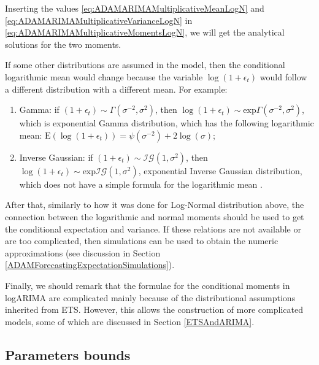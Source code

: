 \documentclass[]{book}
\providecommand{\tightlist}{%
  \setlength{\itemsep}{0pt}\setlength{\parskip}{0pt}}
\theoremstyle{definition}
\theoremstyle{definition}
\theoremstyle{definition}
\theoremstyle{definition}
\theoremstyle{remark}
\begin{document}
Inserting the values \eqref{eq:ADAMARIMAMultiplicativeMeanLogN} and \eqref{eq:ADAMARIMAMultiplicativeVarianceLogN} in \eqref{eq:ADAMARIMAMultiplicativeMomentsLogN}, we will get the analytical solutions for the two moments.

If some other distributions are assumed in the model, then the conditional logarithmic mean would change because the variable \(\log(1+\epsilon_t)\) would follow a different distribution with a different mean. For example:

\begin{enumerate}
\def\labelenumi{\arabic{enumi}.}
\tightlist
\item
  Gamma: if \(\left(1+\epsilon_t \right) \sim \mathcal{\Gamma}(\sigma^{-2}, \sigma^2)\), then \(\log\left(1+\epsilon_t \right) \sim \mathrm{exp}\mathcal{\Gamma}(\sigma^{-2}, \sigma^2)\), which is exponential Gamma distribution, which has the following logarithmic mean: \(\mathrm{E}(\log(1+\epsilon_t)) = \psi\left(\sigma^{-2}\right)+2\log(\sigma)\);
\item
  Inverse Gaussian: if \(\left(1+\epsilon_t \right) \sim \mathcal{IG}(1, \sigma^2)\), then \(\log\left(1+\epsilon_t \right) \sim \mathrm{exp}\mathcal{IG}(1, \sigma^2)\), exponential Inverse Gaussian distribution, which does not have a simple formula for the logarithmic mean \citep[but it can be calculated based on its connection with Generalised \(\mathcal{IG}\) and formulae provided in][]{Sichel1997}.
\end{enumerate}

After that, similarly to how it was done for Log-Normal distribution above, the connection between the logarithmic and normal moments should be used to get the conditional expectation and variance. If these relations are not available or are too complicated, then simulations can be used to obtain the numeric approximations (see discussion in Section \ref{ADAMForecastingExpectationSimulations}).

Finally, we should remark that the formulae for the conditional moments in logARIMA are complicated mainly because of the distributional assumptions inherited from ETS. However, this allows the construction of more complicated models, some of which are discussed in Section \ref{ETSAndARIMA}.

\hypertarget{parameters-bounds}{%
\subsection{Parameters bounds}\label{parameters-bounds}}
\end{document}
